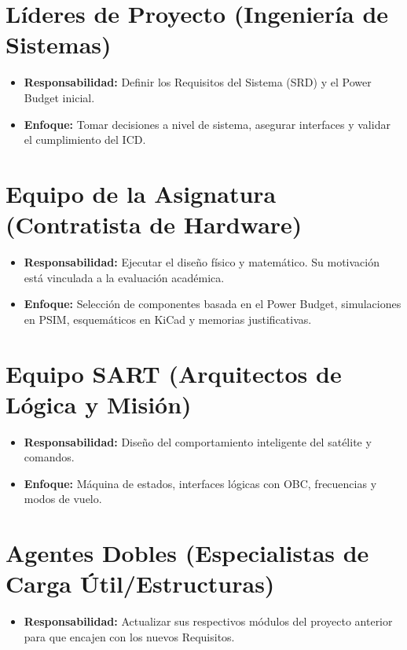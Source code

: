 
\section{Líderes de Proyecto (Ingeniería de Sistemas)}
\begin{itemize}
    \item \textbf{Responsabilidad:} Definir los Requisitos del Sistema (SRD) y el Power Budget inicial.
    \item \textbf{Enfoque:} Tomar decisiones a nivel de sistema, asegurar interfaces y validar el cumplimiento del ICD.
\end{itemize}

\section{Equipo de la Asignatura (Contratista de Hardware)}
\begin{itemize}
    \item \textbf{Responsabilidad:} Ejecutar el diseño físico y matemático. Su motivación está vinculada a la evaluación académica.
    \item \textbf{Enfoque:} Selección de componentes basada en el Power Budget, simulaciones en PSIM, esquemáticos en KiCad y memorias justificativas.
\end{itemize}

\section{Equipo SART (Arquitectos de Lógica y Misión)}
\begin{itemize}
    \item \textbf{Responsabilidad:} Diseño del comportamiento inteligente del satélite y comandos.
    \item \textbf{Enfoque:} Máquina de estados, interfaces lógicas con OBC, frecuencias y modos de vuelo.
\end{itemize}

\section{Agentes Dobles (Especialistas de Carga Útil/Estructuras)}
\begin{itemize}
    \item \textbf{Responsabilidad:} Actualizar sus respectivos módulos del proyecto anterior para que encajen con los nuevos Requisitos.
\end{itemize}